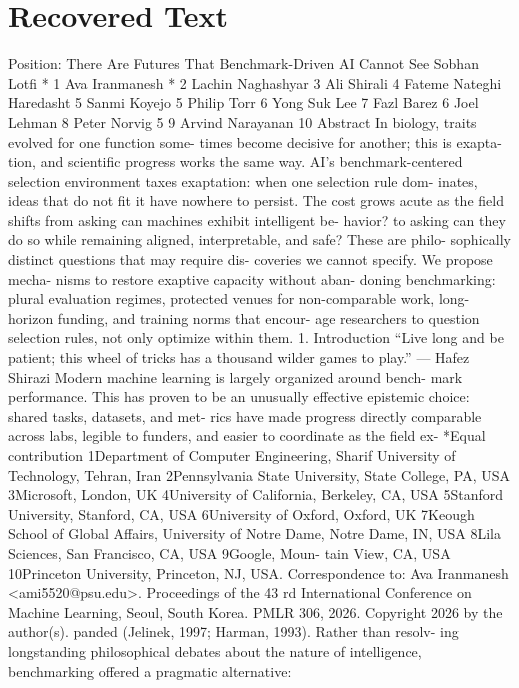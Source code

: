 \section{Recovered Text}
Position: There Are Futures That Benchmark-Driven AI Cannot See
Sobhan Lotfi * 1 Ava Iranmanesh * 2 Lachin Naghashyar 3 Ali Shirali 4 Fateme Nateghi Haredasht 5
Sanmi Koyejo 5 Philip Torr 6 Yong Suk Lee 7 Fazl Barez 6 Joel Lehman 8 Peter Norvig 5 9 Arvind Narayanan 10
Abstract
In biology, traits evolved for one function some-
times become decisive for another; this is exapta-
tion, and scientific progress works the same way.
AI’s benchmark-centered selection environment
taxes exaptation: when one selection rule dom-
inates, ideas that do not fit it have nowhere to
persist. The cost grows acute as the field shifts
from asking can machines exhibit intelligent be-
havior? to asking can they do so while remaining
aligned, interpretable, and safe? These are philo-
sophically distinct questions that may require dis-
coveries we cannot specify. We propose mecha-
nisms to restore exaptive capacity without aban-
doning benchmarking: plural evaluation regimes,
protected venues for non-comparable work, long-
horizon funding, and training norms that encour-
age researchers to question selection rules, not
only optimize within them.
1. Introduction
“Live long and be patient; this wheel of tricks has
a thousand wilder games to play.”
— Hafez Shirazi
Modern machine learning is largely organized around bench-
mark performance. This has proven to be an unusually
effective epistemic choice: shared tasks, datasets, and met-
rics have made progress directly comparable across labs,
legible to funders, and easier to coordinate as the field ex-
*Equal contribution
1Department of Computer Engineering,
Sharif University of Technology, Tehran, Iran 2Pennsylvania State
University, State College, PA, USA 3Microsoft, London, UK
4University of California, Berkeley, CA, USA 5Stanford University,
Stanford, CA, USA 6University of Oxford, Oxford, UK 7Keough
School of Global Affairs, University of Notre Dame, Notre Dame,
IN, USA 8Lila Sciences, San Francisco, CA, USA 9Google, Moun-
tain View, CA, USA 10Princeton University, Princeton, NJ, USA.
Correspondence to: Ava Iranmanesh <ami5520@psu.edu>.
Proceedings of the 43 rd International Conference on Machine
Learning, Seoul, South Korea. PMLR 306, 2026. Copyright 2026
by the author(s).
panded (Jelinek, 1997; Harman, 1993). Rather than resolv-
ing longstanding philosophical debates about the nature of
intelligence, benchmarking offered a pragmatic alternative:
